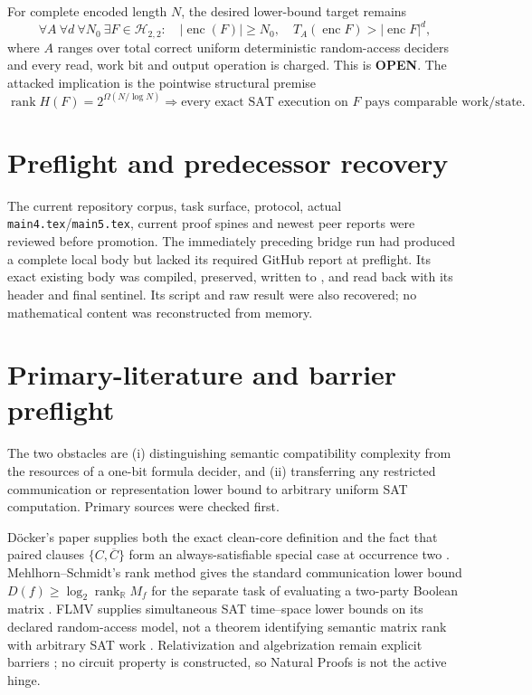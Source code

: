 \documentclass[11pt]{article}
\newcommand{\Htwo}{\mathcal H_{2,2}}
\newcommand{\OPEN}{\textbf{OPEN}}
\begin{document}
For complete encoded length $N$, the desired lower-bound target remains
\[
 \tag{UCORE-TIME1}
 \forall A\ \forall d\ \forall N_0\ \exists F\in\Htwo:
 \quad |\operatorname{enc}(F)|\ge N_0,
 \quad T_A(\operatorname{enc}F)>|\operatorname{enc}F|^d,
\]
where $A$ ranges over total correct uniform deterministic random-access
deciders and every read, work bit and output operation is charged.  This is
\OPEN.  The attacked implication is the pointwise structural premise
\[
 \tag{COMPAT-RANK-FORCES-WORK1}
 \operatorname{rank} H(F)=2^{\Omega(N/\log N)}
 \Longrightarrow
 \text{every exact SAT execution on $F$ pays comparable work/state}.
\]

\section{Preflight and predecessor recovery}

The current repository corpus, task surface, protocol, actual
\texttt{main4.tex}/\texttt{main5.tex}, current proof spines and newest peer
reports were reviewed before promotion.  The immediately preceding bridge
run had produced a complete local body but lacked its required GitHub report
at preflight.  Its exact existing body was compiled, preserved, written to
, and read back with its header and final
sentinel.  Its script and raw result were also recovered; no mathematical
content was reconstructed from memory.

\section{Primary-literature and barrier preflight}

The two obstacles are (i) distinguishing semantic compatibility complexity
from the resources of a one-bit formula decider, and (ii) transferring any
restricted communication or representation lower bound to arbitrary uniform
SAT computation.  Primary sources were checked first.

D\"ocker's paper supplies both the exact clean-core definition and the fact
that paired clauses $\{C,\overline C\}$ form an always-satisfiable special
case at occurrence two \cite{doecker}.  Mehlhorn--Schmidt's rank method gives
the standard communication lower bound
\(D(f)\ge\log_2\operatorname{rank}_{\mathbb R}M_f\) for the separate task of
evaluating a two-party Boolean matrix \cite{mehlhornschmidt}.  FLMV supplies
simultaneous SAT time--space lower bounds on its declared random-access model,
not a theorem identifying semantic matrix rank with arbitrary SAT work
\cite{flmv}.  Relativization and algebrization remain explicit barriers
\cite{bgs,aw}; no circuit property is constructed, so Natural Proofs is not
the active hinge.
\end{document}
